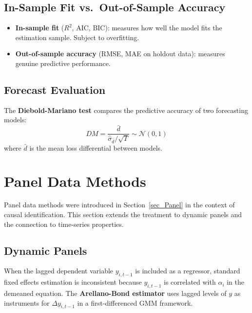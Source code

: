 \subsection{In-Sample Fit vs.\ Out-of-Sample Accuracy}

\begin{itemize}
  \item \textbf{In-sample fit} ($R^2$, AIC, BIC): measures how well the
    model fits the estimation sample. Subject to overfitting.
  \item \textbf{Out-of-sample accuracy} (RMSE, MAE on holdout data):
    measures genuine predictive performance.
\end{itemize}

\subsection{Forecast Evaluation}

The \textbf{Diebold-Mariano test} \citep{Diebold1995} compares the
predictive accuracy of two forecasting models:
\begin{equation}
  DM = \frac{\bar{d}}{\hat\sigma_{\bar{d}}/\sqrt{T}} \sim \mathcal{N}(0,1)
\end{equation}
where $\bar{d}$ is the mean loss differential between models.



\section{Panel Data Methods}
\label{sec_PanelData_TS}

Panel data methods were introduced in Section~\ref{sec_Panel} in the context
of causal identification. This section extends the treatment to dynamic
panels and the connection to time-series properties.

\subsection{Dynamic Panels}

When the lagged dependent variable $y_{i,t-1}$ is included as a regressor,
standard fixed effects estimation is inconsistent because $y_{i,t-1}$ is
correlated with $\alpha_i$ in the demeaned equation. The
\textbf{Arellano-Bond estimator}
\citep{Arellano1991} uses lagged levels of $y$ as instruments for
$\Delta y_{i,t-1}$ in a first-differenced GMM framework.

